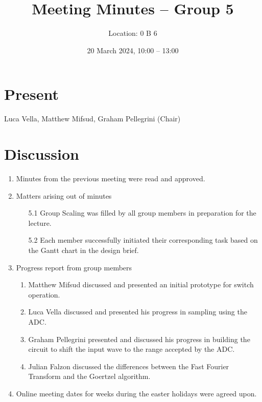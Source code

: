\documentclass{cce2014-meetings}
\title{Meeting Minutes -- Group 5}
\author{Location: 0 B 6}
\date{20 March 2024, 10:00 -- 13:00}
\begin{document}
\maketitle

\section*{Present}
Luca Vella,
Matthew Mifsud,
Graham Pellegrini (Chair)

\section*{Discussion}

\begin{enumerate}


\item Minutes from the previous meeting were read and approved.

\item Matters arising out of minutes
   \begin{enumerate}
   \item [5.1] Group Scaling was filled by all group members in preparation for the lecture. 
   \item [5.2] Each member successfully initiated their corresponding task based on the Gantt chart in the design brief.
   \end{enumerate}

\item Progress report from group members
   \begin{enumerate}
   \item Matthew Mifsud discussed and presented an initial prototype for switch operation.
   \item Luca Vella discussed and presented his progress in sampling using the ADC.
   \item Graham Pellegrini presented and discussed his progress in building the circuit to shift the input wave to the range accepted by the ADC.
   \item Julian Falzon discussed the differences between the Fast Fourier Transform and the Goertzel algorithm.
   \end{enumerate}

\item Online meeting dates for weeks during the easter holidays were agreed upon.


\end{enumerate}
\end{document}

